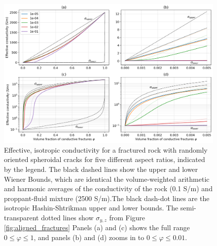 \begin{figure}
    \begin{center}
    \includegraphics[width=\columnwidth]{figures/phys_prop_model/random_fractures.png}
    \end{center}
\caption{
    Effective, isotropic conductivity for a fractured rock with randomly oriented spheroidal
    cracks for five different aspect ratios, indicated by the legend. The black dashed lines show the upper and lower
    Wiener Bounds, which are identical the volume-weighted arithmetic and harmonic averages of the
    conductivity of the rock (0.1 S/m) and proppant-fluid mixture (2500 S/m).The black dash-dot lines
    are the isotropic Hashin-Shtrikman upper and lower bounds.
    The semi-transparent dotted lines show $\sigma_{y, z}$ from Figure \ref{fig:aligned_fractures}
    Panels (a) and (c) shows the
    full range $0 \leq \varphi \leq 1$, and panels (b) and (d) zooms in to $0 \leq \varphi \leq 0.01$.
}
\label{fig:random_fractures}
\end{figure}
